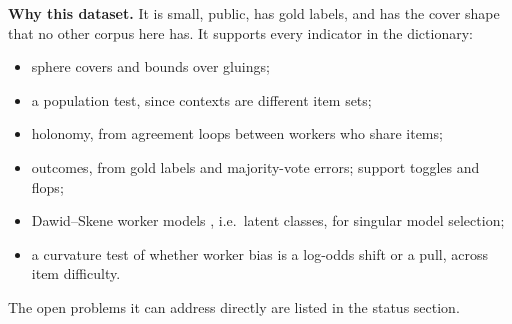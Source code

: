 \documentclass[11pt]{article}
\theoremstyle{definition}
\theoremstyle{remark}
\begin{document}
\textbf{Why this dataset.} It is small, public, has gold labels, and has the cover shape that no other corpus here has. It supports every indicator in the dictionary:
\begin{itemize}
  \item sphere covers and bounds over gluings;
  \item a population test, since contexts are different item sets;
  \item holonomy, from agreement loops between workers who share items;
  \item outcomes, from gold labels and majority-vote errors; support toggles and flops;
  \item Dawid--Skene worker models \cite{dawidskene79}, i.e.\ latent classes, for singular model selection;
  \item a curvature test of whether worker bias is a log-odds shift or a pull, across item difficulty.
\end{itemize}
The open problems it can address directly are listed in the status section.
\end{document}
